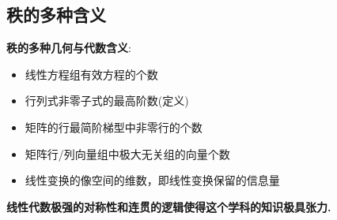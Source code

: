 \documentclass[a4paper,12pt]{ctexart}
\begin{document}
\subsection{秩的多种含义}
\begin{mynote}
\textbf{秩的多种几何与代数含义}:
\begin{itemize}
    \item 线性方程组有效方程的个数
    \item 行列式非零子式的最高阶数(定义)
    \item 矩阵的行最简阶梯型中非零行的个数
    \item 矩阵行/列向量组中极大无关组的向量个数
    \item 线性变换的像空间的维数，即线性变换保留的信息量
\end{itemize}
\end{mynote}

\textbf{线性代数极强的对称性和连贯的逻辑使得这个学科的知识极具张力.}
\end{document}
